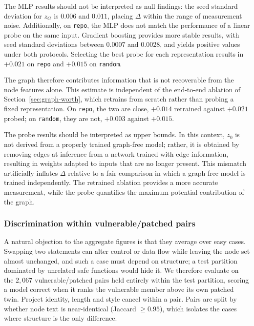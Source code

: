 The MLP results should not be interpreted as null findings: the seed standard deviation for $z_G$ is $0.006$ and $0.011$, placing $\Delta$ within the range of measurement noise. Additionally, on \texttt{repo}, the MLP does not match the performance of a linear probe on the same input. Gradient boosting provides more stable results, with seed standard deviations between $0.0007$ and $0.0028$, and yields positive values under both protocols. Selecting the best probe for each representation results in $+0.021$ on \texttt{repo} and $+0.015$ on \texttt{random}.

The graph therefore contributes information that is not recoverable from the node features alone. This estimate is independent of the end-to-end ablation of Section~\ref{sec:graph-worth}, which retrains from scratch rather than probing a fixed representation. On \texttt{repo}, the two are close, $+0.014$ retrained against $+0.021$ probed; on \texttt{random}, they are not, $+0.003$ against $+0.015$.

The probe results should be interpreted as upper bounds. In this context, $z_0$ is not derived from a properly trained graph-free model; rather, it is obtained by removing edges at inference from a network trained with edge information, resulting in weights adapted to inputs that are no longer present. This mismatch artificially inflates $\Delta$ relative to a fair comparison in which a graph-free model is trained independently. The retrained ablation provides a more accurate measurement, while the probe quantifies the maximum potential contribution of the graph.

\subsubsection{Discrimination within vulnerable/patched pairs}
A natural objection to the aggregate figures is that they average over easy
cases. Swapping two statements can alter control or data flow while leaving the
node set almost unchanged, and such a case must depend on structure; a test
partition dominated by unrelated safe functions would hide it. We therefore
evaluate on the $2{,}067$ vulnerable/patched pairs held entirely within the test
partition, scoring a model correct when it ranks the vulnerable member above its
own patched twin. Project identity, length and style cancel within a pair. Pairs
are split by whether node text is near-identical (Jaccard $\geq 0.95$), which
isolates the cases where structure is the only difference.

